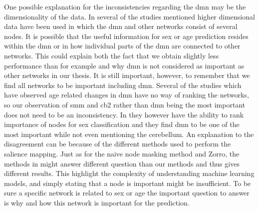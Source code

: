One possible explanation for the inconsistencies regarding the \acrshort{dmn} may be the dimensionality of the data. In several of the studies mentioned higher dimensional data have been used in which the \acrshort{dmn} and other networks consist of several nodes. It is possible that the useful information for sex or age prediction resides within the \acrshort{dmn} or in how individual parts of the \acrshort{dmn} are connected to other networks. This could explain both the fact that we obtain slightly less performance than for example \cite{arslan, understanding_gnn} and why \acrshort{dmn} is not considered as important as other networks in our thesis. It is still important, however, to remember that we find all networks to be important including \acrshort{dmn}. Several of the studies which have observed age related changes in \acrshort{dmn} \cite{meier_svm, song_reorganizational, tomasi_aging} have no way of ranking the networks, so our observation of \acrshort{smm} and \acrshort{cb2} rather than \acrshort{dmn} being the most important does not need to be an inconsistency. In \cite{arslan, understanding_gnn} they however have the ability to rank importance of nodes for sex classification and they find \acrshort{dmn} to be one of the most important while not even mentioning the cerebellum. An explanation to the disagreement can be because of the different methods used to perform the salience mapping. Just as for the naive node masking method and Zorro, the methods in \cite{understanding_gnn, arslan} might answer different question than our methods and thus gives different results. This highlight the complexity of understanding machine learning models, and simply stating that a node is important might be insufficient. To be sure a specific network is related to sex or age the important question to answer is why and how this network is important for the prediction. 

